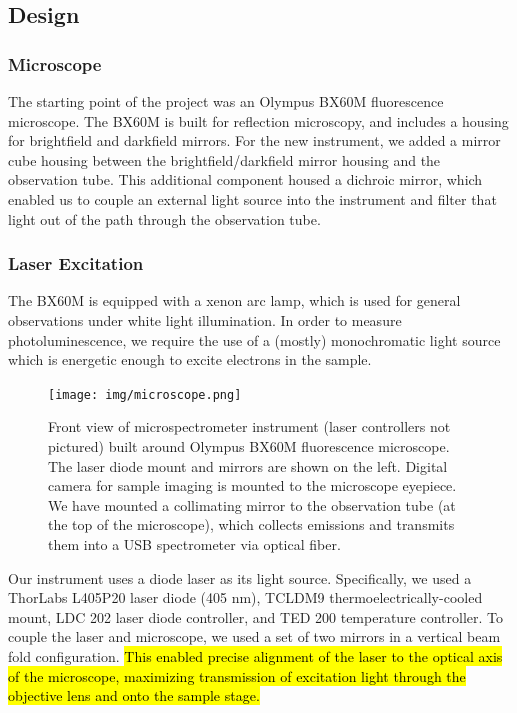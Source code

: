 \subsection{Design}

\subsubsection{Microscope}

The starting point of the project was an Olympus BX60M fluorescence microscope. The BX60M is built for reflection microscopy, and includes a housing for brightfield and darkfield mirrors. For the new instrument, we added a mirror cube housing between the brightfield/darkfield mirror housing and the observation tube. This additional component housed a dichroic mirror, which enabled us to couple an external light source into the instrument and filter that light out of the path through the observation tube.

\subsubsection{Laser Excitation}
The BX60M is equipped with a xenon arc lamp, which is used for general observations under white light illumination. In order to measure photoluminescence, we require the use of a (mostly) monochromatic light source which is energetic enough to excite electrons in the sample.

\begin{figure}[H]
    \centering
    \texttt{[image: img/microscope.png]}
    \caption[Front view of microspectrometer instrument.]{Front view of microspectrometer instrument (laser controllers not pictured) built around Olympus BX60M fluorescence microscope. The laser diode mount and mirrors are shown on the left. Digital camera for sample imaging is mounted to the microscope eyepiece. We have mounted a collimating mirror to the observation tube (at the top of the microscope), which collects emissions and transmits them into a USB spectrometer via optical fiber.}
    \label{img:microscope}
\end{figure}

Our instrument uses a diode laser as its light source. Specifically, we used a ThorLabs L405P20 laser diode (405 nm), TCLDM9 thermoelectrically-cooled mount, LDC 202 laser diode controller, and TED 200 temperature controller. To couple the laser and microscope, we used a set of two mirrors in a vertical beam fold configuration. \hl{This enabled precise alignment of the laser to the optical axis of the microscope, maximizing transmission of excitation light through the objective lens and onto the sample stage.}

